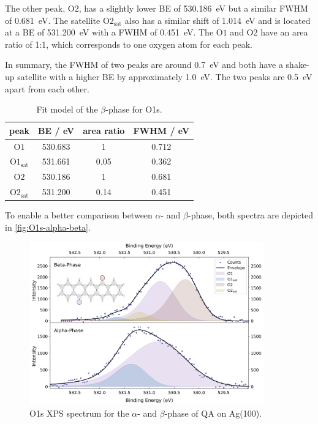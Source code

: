 The other peak, $\mathrm{O2}$, has a slightly lower \ac{BE} of 530.186~\si{\eV} but a similar \ac{FWHM} of 0.681~\si{\eV}. The satellite $\mathrm{O2_{sat}}$ also has a similar shift of 1.014~\si{\eV} and is located at a \ac{BE} of 531.200~\si{\eV} with a \ac{FWHM} of 0.451~\si{\eV}. The $\mathrm{O1}$ and $\mathrm{O2}$ have an area ratio of 1:1, which corresponds to one oxygen atom for each peak.

In summary, the \ac{FWHM} of two peaks are around 0.7~\si{\eV} and both have a shake-up satellite with a higher \ac{BE} by approximately 1.0~\si{\eV}. The two peaks are 0.5~\si{\eV} apart from each other.

\begin{table}[H]
	\centering
	\caption{Fit model of the $\beta$-phase for O1s.}
	\begin{tabular}{|c|c|c|c|}
		\hline
		peak & \ac{BE} / eV & area ratio & FWHM / eV \\
		\hline
		$\mathrm{O1}$ & 530.683 & 1 & 0.712 \\ \hline
		$\mathrm{O1_{sat}}$ & 531.661 & 0.05 & 0.362 \\ \hline
		$\mathrm{O2}$ & 530.186 & 1 & 0.681 \\ \hline
		$\mathrm{O2_{sat}}$ & 531.200 & 0.14 & 0.451 \\ \hline
	\end{tabular}
	\label{tab:O1s-beta-fit}
\end{table}

To enable a better comparison between $\alpha$- and $\beta$-phase, both spectra are depicted in \autoref{fig:O1s-alpha-beta}.

\begin{figure}[H]
	\centering
	\includegraphics[width=0.9\textwidth]{images/O1s-phase-comparison.png}
	\caption{O1s \ac{XPS} spectrum for the $\alpha$- and $\beta$-phase  of \ac{QA} on Ag(100).}
	\label{fig:O1s-alpha-beta}
\end{figure}

